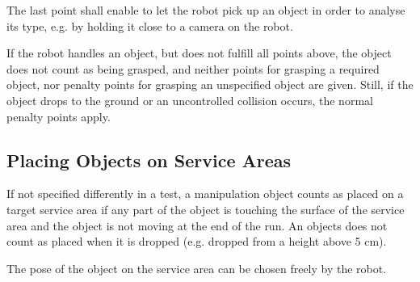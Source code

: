 \par
The last point shall enable to let the robot pick up an object in order to analyse its type, e.g. by holding it close to a camera on the robot.
\par
If the robot handles an object, but does not fulfill all points above, the object does not count as being grasped, and neither points for grasping a required object, nor penalty points for grasping an unspecified object are given. Still, if the object drops to the ground or an uncontrolled collision occurs, the normal penalty points apply.

\subsection{Placing Objects on Service Areas} \label{ssec:PlacingObjects}
If not specified differently in a test, a manipulation object counts as placed on a target service area if any part of the object is touching the surface of the service area and the object is not moving at the end of the run. An objects does not count as placed when it is dropped (e.g. dropped from a height above 5 cm). 
\par
The pose of the object on the service area can be chosen freely by the robot.


